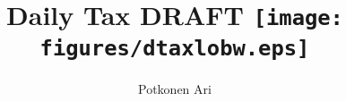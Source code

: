 \documentclass[a5paper,final]{memoir} %
\begin{document}
\title{\Huge\textbf{Daily Tax} \linebreak DRAFT \linebreak \linebreak
\texttt{[image: figures/dtaxlobw.eps]}}
\author{\Large Potkonen Ari} 
\maketitle
\pagebreak
\pagestyle{plain}
\parindent 0pt
\setcounter{page}{1}


\tableofcontents
\listoffigures

\pagebreak
\pagestyle{headings}
\setcounter{page}{1}
\parindent 0pt




%
%
\printbibliography
%
\appendix

\printindex
\pagestyle{plain}

\end{document}
